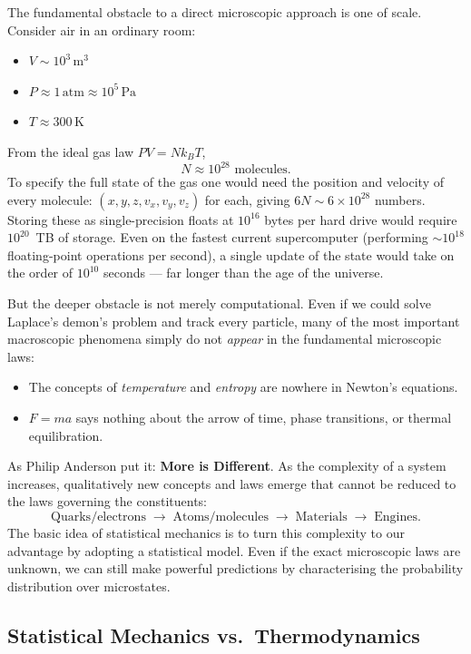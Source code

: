 The fundamental obstacle to a direct microscopic approach is one of scale. Consider air in an
ordinary room:
\begin{itemize}
  \item $V \sim 10^3\,\mathrm{m}^3$
  \item $P \approx 1\,\mathrm{atm} \approx 10^5\,\mathrm{Pa}$
  \item $T \approx 300\,\mathrm{K}$
\end{itemize}
From the ideal gas law $PV = Nk_BT$,
\[
  N \approx 10^{28} \text{ molecules}.
\]
To specify the full state of the gas one would need the position and velocity of every molecule:
$(x, y, z, v_x, v_y, v_z)$ for each, giving $6N \sim 6 \times 10^{28}$ numbers. Storing these
as single-precision floats at $10^{16}$ bytes per hard drive would require $10^{20}$~TB of
storage. Even on the fastest current supercomputer (performing $\sim 10^{18}$ floating-point
operations per second), a single update of the state would take on the order of $10^{10}$
seconds --- far longer than the age of the universe.

But the deeper obstacle is not merely computational. Even if we could solve Laplace's demon's
problem and track every particle, many of the most important macroscopic phenomena simply do
not \emph{appear} in the fundamental microscopic laws:
\begin{itemize}
  \item The concepts of \emph{temperature} and \emph{entropy} are nowhere in Newton's equations.
  \item $F = ma$ says nothing about the arrow of time, phase transitions, or thermal
        equilibration.
\end{itemize}
As Philip Anderson put it: \textbf{More is Different}. As the complexity of a system increases,
qualitatively new concepts and laws emerge that cannot be reduced to the laws governing the
constituents:
\[
  \text{Quarks/electrons} \;\to\; \text{Atoms/molecules} \;\to\; \text{Materials} \;\to\;
  \text{Engines.}
\]
The basic idea of statistical mechanics is to turn this complexity to our advantage by adopting
a statistical model. Even if the exact microscopic laws are unknown, we can still make powerful
predictions by characterising the probability distribution over microstates.

\subsection{Statistical Mechanics vs.\ Thermodynamics}

